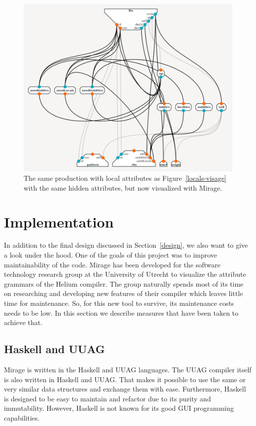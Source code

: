 \documentclass[11pt]{article}
\begin{document}
\begin{figure}[h]
  \centering
  \includegraphics[scale=1.4]{locals-mirage}
  \caption{The same production with local attributes as Figure~\ref{locals-visage} with the same hidden attributes, but now visualized with Mirage.}
  \label{locals-mirage}
\end{figure}

\section{Implementation}

In addition to the final design discussed in Section~\ref{design}, we also want to give a look under the hood. One of the goals of this project was to improve maintainability of the code.
Mirage has been developed for the software technology research group at the University of Utrecht to visualize the attribute grammars of the Helium compiler. 
The group naturally spends most of its time on researching and developing new features of their compiler which leaves little time for maintenance. So, for this new tool to survive, its maintenance costs needs to be low.
In this section we describe measures that have been taken to achieve that.

\subsection{Haskell and UUAG}

Mirage is written in the Haskell and UUAG languages.
The UUAG compiler itself is also written in Haskell and UUAG.
That makes it possible to use the same or very similar data structures and exchange them with ease.
Furthermore, Haskell is designed to be easy to maintain and refactor due to its purity and immutability.
However, Haskell is not known for its good GUI programming capabilities.
\end{document}
